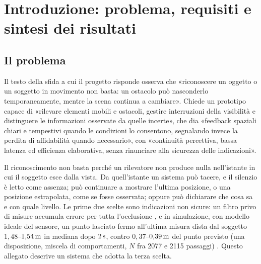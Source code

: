 \section{Introduzione: problema, requisiti e sintesi dei risultati}\label{sec:intro}

\subsection{Il problema}\label{sec:intro-problema}

Il testo della sfida a cui il progetto risponde osserva che «riconoscere un oggetto o un soggetto in movimento non basta: un ostacolo può nasconderlo temporaneamente, mentre la scena continua a cambiare». Chiede un prototipo capace di «rilevare elementi mobili e ostacoli, gestire interruzioni della visibilità e distinguere le informazioni osservate da quelle incerte», che dia «feedback spaziali chiari e tempestivi quando le condizioni lo consentono, segnalando invece la perdita di affidabilità quando necessario», con «continuità percettiva, bassa latenza ed efficienza elaborativa, senza rinunciare alla sicurezza delle indicazioni».

Il riconoscimento non basta perché un rilevatore non produce nulla nell'istante in cui il soggetto esce dalla vista. Da quell'istante un sistema può tacere, e il silenzio è letto come assenza; può continuare a mostrare l'ultima posizione, o una posizione estrapolata, come se fosse osservata; oppure può dichiarare che cosa sa e con quale livello. Le prime due scelte sono indicazioni non sicure: un filtro privo di misure accumula errore per tutta l'occlusione \cite{cao2023}, e in simulazione, con modello ideale del sensore, un punto lasciato fermo all'ultima misura dista dal soggetto $1{,}48$--$1{,}54\,\mathrm{m}$ in mediana dopo $2\,\mathrm{s}$, contro $0{,}37$--$0{,}39\,\mathrm{m}$ del punto previsto (una disposizione, miscela di comportamenti, $N$ fra 2077 e 2115 passaggi) . Questo allegato descrive un sistema che adotta la terza scelta.

